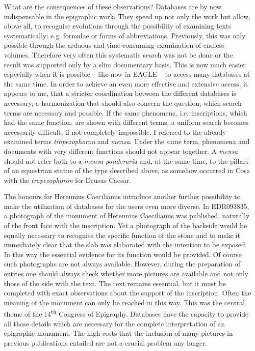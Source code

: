 \documentclass{article}
\begin{document}
What are the consequences of these observations? Databases are by now indispensable 
in the epigraphic work. They speed up not only the work but allow, above all, to 
recognise evolutions through the possibility of examining texts systematically: 
e.g. formulae or forms of abbreviations. Previously, this was only possible through 
the arduous and time-consuming examination of endless volumes. Therefore very often 
this systematic search was not be done or the result was supported only by a slim 
documentary basis. This is now much easier especially when it is possible – like 
now in EAGLE – to access many databases at the same time. In order to achieve 
an even more effective and extensive access, it appears to me, that a stricter 
coordination between the different databases is necessary, a harmonization that 
should also concern the question, which search terms are necessary and possible. 
If the same phenomena, i.e. inscriptions, which had the same function, are shown 
with different terms, a uniform search becomes necessarily difficult, if not completely 
impossible. I referred to the already examined terms \textit{trapezophoron} and 
\textit{mensa}. Under the same term, phenomena and documents with very different 
functions should not appear together. A \textit{mensa }should not refer both to 
a \textit{mensa ponderaria} and, at the same time, to the pillars of an equestrian 
statue of the type described above, as somehow occurred in Cosa with the \textit{trapezophoron 
}for Drusus Caesar. 

The honours for Herennius Caecilianus introduce another further possibility to 
make the utilization of databases for the users even more diverse. In EDR093835, 
a photograph of the monument of Herennius Caecilianus was published, naturally 
of the front face with the inscription. Yet a photograph of the backside would 
be equally necessary to recognise the specific function of the stone and to make 
it immediately clear that the slab was elaborated with the intention to be exposed. 
In this way the essential evidence for its function would be provided. Of course 
such photographs are not always available. However, during the preparation of entries 
one should always check whether more pictures are available and not only those 
of the side with the text. The text remains essential, but it must be completed 
with exact observations about the support of the inscription. Often the meaning 
of the monument can only be reached in this way. This was the central theme of 
the 14\textsuperscript{th} Congress of Epigraphy. Databases have the capacity to 
provide all those details which are necessary for the complete interpretation of 
an epigraphic monument. The high costs that the inclusion of many pictures in previous 
publications entailed are not a crucial problem any longer. 
\end{document}
